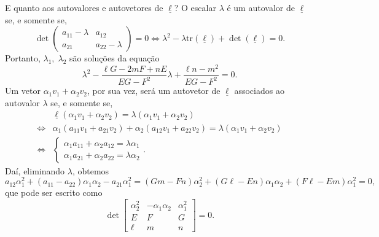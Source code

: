 \documentclass[../differential_geometry.tex]{subfiles}
\begin{document}
E quanto aos autovalores e autovetores de \(\underline{\ell }\)?
O escalar \(\lambda \) é um autovalor de \(\underline{\ell }\) se, e somente se,
\[
	\det \begin{pmatrix}
		a_{11} - \lambda & a_{12}           \\
		a_{21}           & a_{22} - \lambda
	\end{pmatrix} = 0 \Longleftrightarrow \lambda^{2}-\lambda \mathrm{tr}(\underline{\ell })+\det{(\underline{\ell })}=0.
\]
Portanto, \(\lambda_1,\; \lambda_2\) são soluções da equação
\[
	\lambda^{2} - \frac{\ell G - 2mF + nE}{EG-F^{2}}\lambda  + \frac{\ell n - m^{2}}{EG-F^{2}} = 0.
\]
Um vetor \(\alpha_1v_1+\alpha_2v_2\), por sua vez, será um autovetor de \(\underline{\ell }\) associados ao autovalor \(\lambda \) se, e somente se,
\begin{align*}
	                    & \underline{\ell }(\alpha_{1}v_1 + \alpha_2v_2) = \lambda (\alpha_1v_1+\alpha_2v_2)                     \\
	\Longleftrightarrow & \alpha_1(a_{11}v_1 + a_{21}v_2) + \alpha_2(a_{12}v_1 + a_{22}v_2) = \lambda(\alpha_1v_1 + \alpha_2v_2) \\
	\Longleftrightarrow & \left\{\begin{array}{ll}
		                             \alpha_1a_{11} + \alpha_2a_{12} = \lambda\alpha_1 \\
		                             \alpha_1a_{21} + \alpha_2a_{22} = \lambda\alpha_2
	                             \end{array}\right..
\end{align*}
Daí, eliminando \(\lambda\), obtemos
\[
	a_{12}\alpha_{1}^{2} + (a_{11}-a_{22})\alpha_1\alpha_2 - a_{21}\alpha_{1}^{2} = (Gm-Fn)\alpha_{2}^{2}+(G\ell -En)\alpha_{1}\alpha_{2}+(F\ell -Em)\alpha_{1}^{2}=0,
\]
que pode ser escrito como
\[
	\det \begin{bmatrix}
		\alpha_{2}^{2} & -\alpha_1\alpha_2 & \alpha_{1}^{2} \\
		E              & F                 & G              \\
		\ell           & m                 & n
	\end{bmatrix} = 0.
\]
\end{document}
